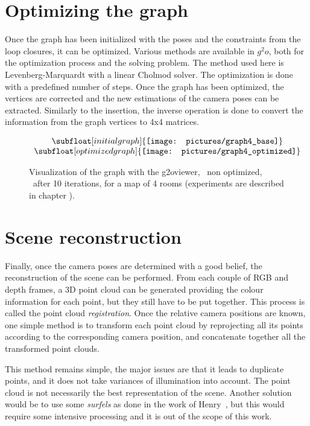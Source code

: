 \section{Optimizing the graph}

Once the graph has been initialized with the poses and the constraints from the loop closures, it can be optimized. Various methods are available in $g^2o$, both for the optimization process and the solving problem. The method used here is Levenberg-Marquardt with a linear Cholmod solver. The optimization is done with a predefined number of steps. Once the graph has been optimized, the vertices are corrected and the new estimations of the camera poses can be extracted. Similarly to the insertion, the inverse operation is done to convert the information from the graph vertices to 4x4 matrices.

\begin{figure}[H]
\centering$
 \begin{array}{c}
 \subfloat[initial graph]{\label{fig:g2o_view_1}\texttt{[image: pictures/graph4\_base]}} \\
 \subfloat[optimized graph]{\label{fig:g2o_view_2}\texttt{[image: pictures/graph4\_optimized]}}
 \end{array}$
\caption{Visualization of the graph with the g2oviewer, ~non optimized, ~after 10 iterations, for a map of 4 rooms (experiments are described in chapter \protect{\ref{chap:experiments}}).}
\end{figure}
\clearpage

\section{Scene reconstruction}

Finally, once the camera poses are determined with a good belief, the reconstruction of the scene can be performed. From each couple of RGB and depth frames, a 3D point cloud can be generated providing the colour information for each point, but they still have to be put together. This process is called the point cloud \emph{registration}. Once the relative camera positions are known, one simple method is to transform each point cloud by reprojecting all its points according to the corresponding camera position, and concatenate together all the transformed point clouds.

This method remains simple, the major issues are that it leads to duplicate points, and it does not take variances of illumination into account. The point cloud is not necessarily the best representation of the scene. Another solution would be to use some \emph{surfels} as done in the work of Henry~\cite{Henry_RGBD_2010}, but this would require some intensive processing and it is out of the scope of this work.

